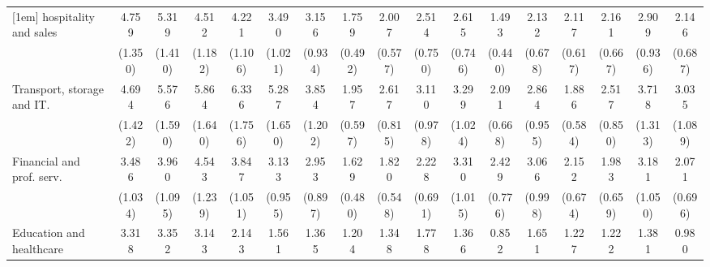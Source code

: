 {\begin{tabular}{l*{16}{c}}
[1em]
hospitality and sales&       4.759\sym{***}&       5.319\sym{***}&       4.512\sym{***}&       4.221\sym{***}&       3.490\sym{***}&       3.156\sym{***}&       1.759\sym{*}  &       2.007\sym{*}  &       2.514\sym{**} &       2.615\sym{***}&       1.493         &       2.132\sym{*}  &       2.117\sym{*}  &       2.161\sym{*}  &       2.909\sym{***}&       2.146\sym{*}  \\
                    &     (1.350)         &     (1.410)         &     (1.182)         &     (1.106)         &     (1.021)         &     (0.934)         &     (0.492)         &     (0.577)         &     (0.750)         &     (0.746)         &     (0.440)         &     (0.678)         &     (0.617)         &     (0.667)         &     (0.936)         &     (0.687)         \\
[1em]
Transport, storage and IT.&       4.694\sym{***}&       5.576\sym{***}&       5.864\sym{***}&       6.336\sym{***}&       5.287\sym{***}&       3.854\sym{***}&       1.957\sym{*}  &       2.617\sym{**} &       3.110\sym{***}&       3.299\sym{***}&       2.091\sym{*}  &       2.864\sym{**} &       1.886\sym{*}  &       2.517\sym{**} &       3.718\sym{***}&       3.035\sym{**} \\
                    &     (1.422)         &     (1.590)         &     (1.640)         &     (1.756)         &     (1.650)         &     (1.202)         &     (0.597)         &     (0.815)         &     (0.978)         &     (1.024)         &     (0.668)         &     (0.955)         &     (0.584)         &     (0.850)         &     (1.313)         &     (1.089)         \\
[1em]
Financial and prof. serv.&       3.486\sym{***}&       3.960\sym{***}&       4.543\sym{***}&       3.847\sym{***}&       3.133\sym{***}&       2.953\sym{***}&       1.629         &       1.820\sym{*}  &       2.228\sym{**} &       3.310\sym{***}&       2.429\sym{**} &       3.066\sym{***}&       2.152\sym{*}  &       1.983\sym{*}  &       3.181\sym{***}&       2.071\sym{*}  \\
                    &     (1.034)         &     (1.095)         &     (1.239)         &     (1.051)         &     (0.955)         &     (0.897)         &     (0.480)         &     (0.548)         &     (0.691)         &     (1.015)         &     (0.776)         &     (0.998)         &     (0.674)         &     (0.659)         &     (1.050)         &     (0.696)         \\
[1em]
Education and healthcare&       3.318\sym{***}&       3.352\sym{***}&       3.143\sym{***}&       2.143\sym{*}  &       1.561         &       1.365         &       1.204         &       1.348         &       1.778         &       1.366         &       0.852         &       1.651         &       1.227         &       1.222         &       1.381         &       0.980         \\

\end{tabular}}
